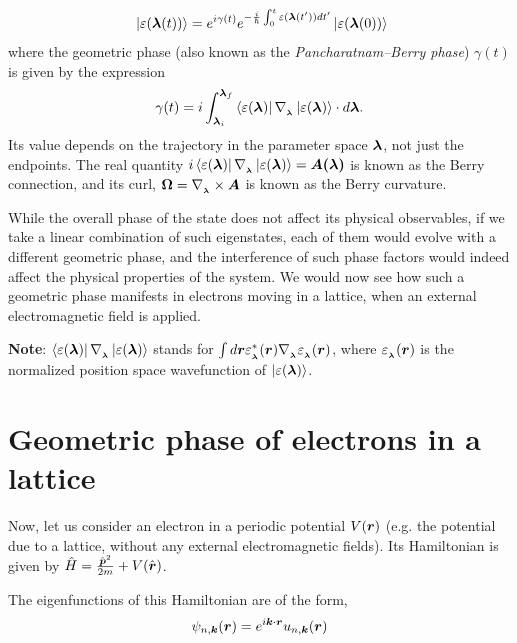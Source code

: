 \documentclass{report}
\renewcommand\vec[1]{\ensuremath\boldsymbol{#1}} %
\begin{document}
\begin{equation}~\label{Eq:BerryPhaseOriginal}
	\ket{\varepsilon(\vec{\lambda}(t))} = e^{i \gamma(t)} e^{-\frac{i}{\hbar} \int_0^t \varepsilon(\vec{\lambda}(t')) dt'} \ket{\varepsilon(\vec{\lambda}(0))}
\end{equation}
where the geometric phase (also known as the \textit{Pancharatnam–Berry phase}) $\gamma(t)$ is given by the expression $$\gamma(t) = i\int_{\vec{\lambda}_i}^{\vec{\lambda}_f} \bra{\varepsilon({\vec{\lambda}})}\nabla_{_{\vec{\lambda}}} \ket{\varepsilon({\vec{\lambda}})} \cdot d \vec{\lambda}.$$ Its value depends on the trajectory in the parameter space $\vec{\lambda}$, not just the endpoints. The real quantity $i\bra{\varepsilon({\vec{\lambda}})}\nabla_{_{\vec{\lambda}}}\ket{\varepsilon({\vec{\lambda}})} = \vec{A(\vec{\lambda})}$ is known as the Berry connection, and its curl, $\vec{\Omega} = \nabla_{_{\vec{\lambda}}} \times \vec{A}$ is known as the Berry curvature.

While the overall phase of the state does not affect its physical observables, if we take a linear combination of such eigenstates, each of them would evolve with a different geometric phase, and the interference of such phase factors would indeed affect the physical properties of the system. We would now see how such a geometric phase manifests in electrons moving in a lattice, when an external electromagnetic field is applied.

\textbf{Note}: $\bra{\varepsilon({\vec{\lambda}})}\nabla_{_{\vec{\lambda}}} \ket{\varepsilon({\vec{\lambda}})}$ stands for $\int d\vec{r} \varepsilon_{_{\vec{\lambda}}}^* (\vec{r}) \nabla_{_{\vec{\lambda}}} \varepsilon_{_{\vec{\lambda}}}(\vec{r})$, where $\varepsilon_{_{\vec{\lambda}}}(\vec{r})$ is the normalized position space wavefunction of $\ket{\varepsilon({\vec{\lambda}})}$.

\section{Geometric phase of electrons in a lattice}
Now, let us consider an electron in a periodic potential $V(\vec{r})$ (e.g. the potential due to a lattice, without any external electromagnetic fields). Its Hamiltonian is given by $\hat{H} = \frac{{\hat{\vec{p}}}^2}{2 m} + V(\hat{\vec{r}})$.

The eigenfunctions of this Hamiltonian are of the form,
$$\psi_{n, \vec{k}} (\vec{r}) = e^{i \vec{k}\cdot \vec{r}} u_{n,\vec{k}} (\vec{r})$$
\end{document}
